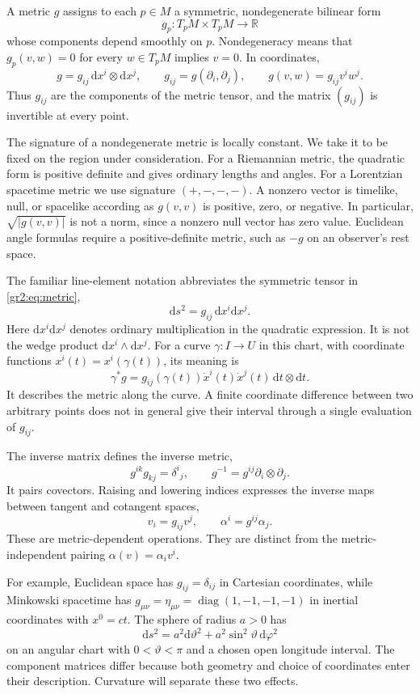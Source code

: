 \documentclass[11pt,a4paper]{article}
\numberwithin{equation}{section}
\newcommand{\R}{\mathbb R}
\newcommand{\dd}{\mathrm d}
\begin{document}
A metric \(g\) assigns to each \(p\in M\) a symmetric, nondegenerate
bilinear form
\[
 g_p:T_pM\times T_pM\longrightarrow\R
\]
whose components depend smoothly on \(p\). Nondegeneracy means that
\(g_p(v,w)=0\) for every \(w\in T_pM\) implies \(v=0\). In coordinates,
\begin{equation}
 g=g_{ij}\,\dd x^i\otimes\dd x^j,
 \qquad g_{ij}=g(\partial_i,\partial_j),
 \qquad g(v,w)=g_{ij}v^iw^j.
 \label{gr2:eq:metric}
\end{equation}
Thus \(g_{ij}\) are the components of the metric tensor, and the matrix
\((g_{ij})\) is invertible at every point.

The signature of a nondegenerate metric is locally constant. We take it
to be fixed on the region under consideration. For a Riemannian metric,
the quadratic form is positive definite and gives ordinary lengths and
angles. For a Lorentzian spacetime metric we use signature
\((+,-,-,-)\). A nonzero vector is timelike, null, or spacelike according
as \(g(v,v)\) is positive, zero, or negative. In particular,
\(\sqrt{|g(v,v)|}\) is not a norm, since a nonzero null vector has zero
value. Euclidean angle formulas require a positive-definite metric,
such as \(-g\) on an observer's rest space.

The familiar line-element notation abbreviates the symmetric tensor
in \eqref{gr2:eq:metric},
\[
 \dd s^2=g_{ij}\,\dd x^i\dd x^j.
\]
Here \(\dd x^i\dd x^j\) denotes ordinary multiplication in the
quadratic expression. It is not the wedge product
\(\dd x^i\wedge\dd x^j\).
For a curve \(\gamma:I\to U\) in this chart, with coordinate functions
\(x^i(t)=x^i(\gamma(t))\), its meaning is
\[
 \gamma^*g
 =g_{ij}(\gamma(t))\dot x^i(t)\dot x^j(t)\,\dd t\otimes\dd t.
\]
It describes the metric along the curve. A finite coordinate difference
between two arbitrary points does not in general give their interval
through a single evaluation of \(g_{ij}\).

The inverse matrix defines the inverse metric,
\begin{equation}
 g^{ik}g_{kj}=\delta^i{}_j,
 \qquad
 g^{-1}=g^{ij}\partial_i\otimes\partial_j.
 \label{gr2:eq:inverse-metric}
\end{equation}
It pairs covectors. Raising and lowering indices expresses the inverse
maps between tangent and cotangent spaces,
\[
 v_i=g_{ij}v^j,
 \qquad \alpha^i=g^{ij}\alpha_j.
\]
These are metric-dependent operations. They are distinct from the
metric-independent pairing \(\alpha(v)=\alpha_i v^i\).

For example, Euclidean space has \(g_{ij}=\delta_{ij}\) in Cartesian
coordinates, while Minkowski spacetime has
\(g_{\mu\nu}=\eta_{\mu\nu}=\operatorname{diag}(1,-1,-1,-1)\)
in inertial coordinates with \(x^0=ct\). The sphere of radius \(a>0\)
has
\[
 \dd s^2=a^2\dd\vartheta^2+a^2\sin^2\vartheta\,\dd\varphi^2
\]
on an angular chart with \(0<\vartheta<\pi\) and a chosen open longitude
interval. The component matrices differ because both geometry and
choice of coordinates enter their description. Curvature will separate
these two effects.
\end{document}
